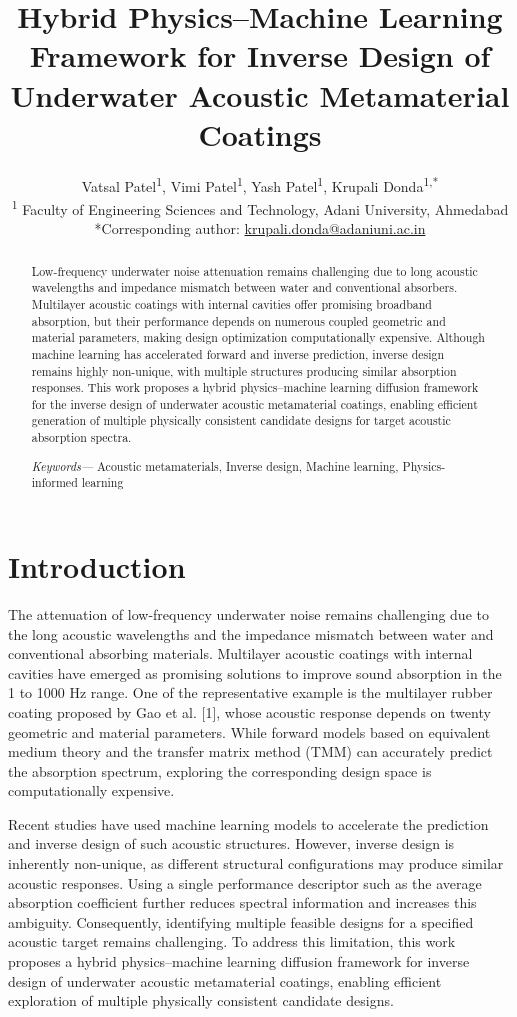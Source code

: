 \documentclass[conference]{IEEEtran}
\title{Hybrid Physics–Machine Learning Framework for
Inverse Design of Underwater Acoustic
Metamaterial Coatings}
\author{
Vatsal Patel\textsuperscript{1}, Vimi Patel\textsuperscript{1}, Yash Patel\textsuperscript{1}, Krupali Donda\textsuperscript{1,*} \\[1ex]
\textsuperscript{1} Faculty of Engineering Sciences and Technology, Adani University, Ahmedabad\\

*Corresponding author: \href{mailto:krupali.donda@adaniuni.ac.in}{krupali.donda@adaniuni.ac.in}
}
\begin{document}
\maketitle

\begin{abstract}
Low-frequency underwater noise attenuation remains challenging due to long acoustic wavelengths and impedance mismatch between water and conventional absorbers. Multilayer acoustic coatings with internal cavities offer promising broadband absorption, but their performance depends on numerous coupled geometric and material parameters, making design optimization computationally expensive. Although machine learning has accelerated forward and inverse prediction, inverse design remains highly non-unique, with multiple structures producing similar absorption responses. This work proposes a hybrid physics–machine learning diffusion framework for the inverse design of underwater acoustic metamaterial coatings, enabling efficient generation of multiple physically consistent candidate designs for target acoustic absorption spectra.


\textit{Keywords—} Acoustic metamaterials, Inverse design, Machine learning, Physics-informed learning
\end{abstract}

\section{Introduction}
The attenuation of low-frequency underwater noise remains challenging due to the long acoustic wavelengths and the impedance mismatch between water and conventional absorbing materials. Multilayer acoustic coatings with internal cavities have emerged as promising solutions to improve sound absorption in the 1 to 1000 Hz range. One of the representative example is the multilayer rubber coating proposed by Gao et al. [1], whose acoustic response depends on twenty geometric and material parameters. While forward models based on equivalent medium theory and the transfer matrix method (TMM) can accurately predict the absorption spectrum, exploring the corresponding design space is computationally expensive.

Recent studies have used machine learning models to accelerate the prediction and inverse design of such acoustic structures. However, inverse design is inherently non-unique, as different structural configurations may produce similar acoustic responses. Using a single performance descriptor such as the average absorption coefficient further reduces spectral information and increases this ambiguity. Consequently, identifying multiple feasible designs for a specified acoustic target remains challenging. To address this limitation, this work proposes a hybrid physics–machine learning diffusion framework for inverse design of underwater acoustic metamaterial coatings, enabling efficient exploration of multiple physically consistent candidate designs.
\end{document}
